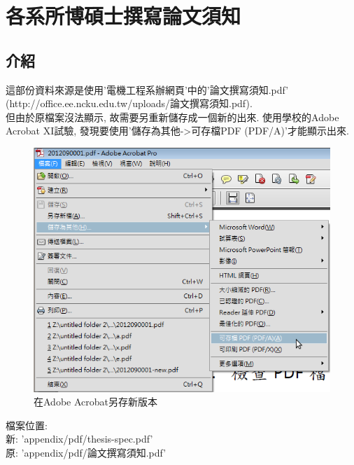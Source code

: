 \newpage
{}

\chapter{各系所博碩士撰寫論文須知}
\label{appendix:thesis-spec}

\section{介紹}
這部份資料來源是使用'電機工程系辦網頁'中的'論文撰寫須知.pdf' (http://office.ee.ncku.edu.tw/uploads/論文撰寫須知.pdf).\\

但由於原檔案沒法顯示, 故需要另重新儲存成一個新的出來. 使用學校的Adobe Acrobat XI試驗, 發現要使用'儲存為其他->可存檔PDF (PDF/A)'才能顯示出來.\\

\begin{figure}[h]
\centering
\includegraphics[scale=0.35]{./appendix/pic/save_pdf.png}
\caption{在Adobe Acrobat另存新版本}
\label{fig:appendix:save_pdf}
\end{figure}

檔案位置:\\
新: 'appendix/pdf/thesis-spec.pdf'\\
原: 'appendix/pdf/論文撰寫須知.pdf'\\



